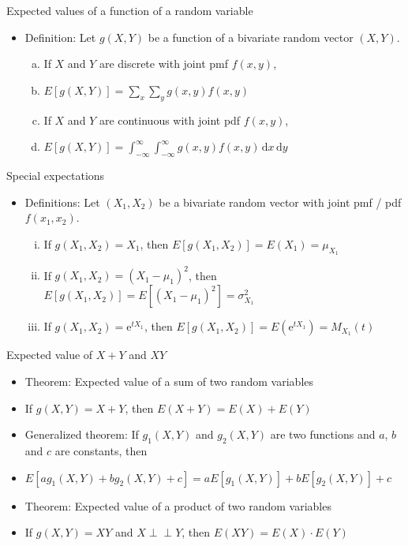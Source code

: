 \documentclass{article}
\newcommand{\ind}{\perp \!\!\! \perp}			%
\newcommand{\integral}[4]{\displaystyle \int_{#1}^{#2} #3 \,\mathrm{d} #4}		%
\newcommand{\e}{\mathrm{e}}		%
\begin{document}
Expected values of a function of a random variable
\begin{itemize}
    \item Definition: Let $g(X,Y)$ be a function of a bivariate random vector $(X,Y)$.
    \begin{enumerate}[(a)]
        \item If $X$ and $Y$ are discrete with joint pmf $f(x,y)$,
        \item[] $\displaystyle E[g(X,Y)] = \sum_x \sum_y g(x,y) f(x,y)$
        \item If $X$ and $Y$ are continuous with joint pdf $f(x,y)$,
        \item[] $\displaystyle E[g(X,Y)] = \integral{-\infty}{\infty}{\integral{-\infty}{\infty}{g(x,y) f(x,y)}{x}}{y}$
    \end{enumerate}
\end{itemize}\bigskip

\newpage

Special expectations
\begin{itemize}
    \item Definitions: Let $(X_1,X_2)$ be a bivariate random vector with joint pmf / pdf $f(x_1,x_2)$.
    \begin{enumerate}[i)]
        \item If $g(X_1,X_2) = X_1$, then $E[g(X_1,X_2)] = E(X_1) = \mu_{X_1}$ 
        \item If $g(X_1,X_2) = (X_1 - \mu_1)^2$, then $E[g(X_1,X_2)] = E[(X_1 - \mu_1)^2]  = \sigma_{X_1}^2$ 
        \item If $g(X_1,X_2) = \e^{tX_1}$, then $E[g(X_1,X_2)] = E(\e^{tX_1}) = M_{X_1}(t)$
    \end{enumerate}
\end{itemize}\bigskip

Expected value of $X + Y$ and $XY$
\begin{itemize}
    \item Theorem: Expected value of a sum of two random variables
    \item[] If $g(X,Y) = X + Y$, then $E(X + Y) = E(X) + E(Y)$
    \item Generalized theorem: If $g_1(X,Y)$ and $g_2(X,Y)$ are two functions and $a$, $b$ and $c$ are constants, then
    \item[] $E[ag_1(X,Y) + bg_2(X,Y) + c] = aE[g_1(X,Y)] + bE[g_2(X,Y)] + c$
    \item Theorem: Expected value of a product of two random variables
    \item[] If $g(X,Y) = XY$ and $X \ind Y$, then $E(XY) = E(X) \cdot E(Y)$
\end{itemize}\bigskip\bigskip
\end{document}

